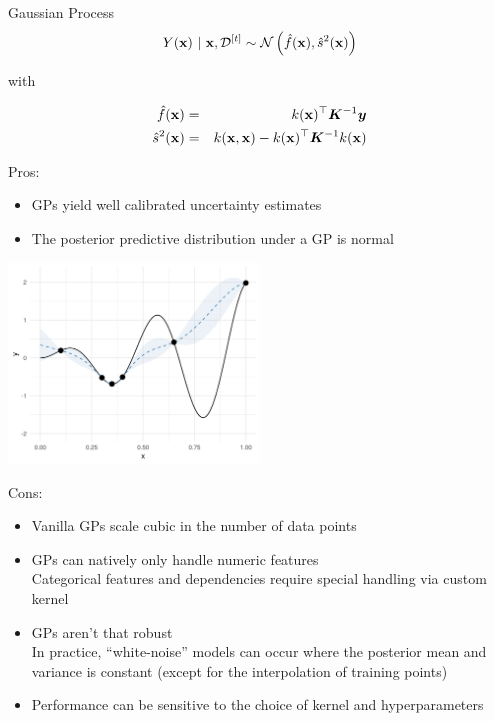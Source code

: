 \documentclass[11pt,compress,t,notes=noshow, xcolor=table]{beamer}
\begin{document}
\begin{vbframe}{Gaussian Process}
\begin{eqnarray*}
  Y(\mathbf{x}) ~|~ \mathbf{x}, \mathcal{D}^{[t]} \sim \mathcal{N}\left(\hat{f}(\mathbf{x}), \hat{s}^2(\mathbf{x})\right)
\end{eqnarray*}

with 

\begin{eqnarray*}
  \hat{f}(\mathbf{x}) &=& k(\mathbf{x})^\top \bm{K}^{-1} \bm{y} \\
  \hat{s}^2(\mathbf{x}) &=& k(\mathbf{x}, \mathbf{x}) - k(\mathbf{x})^\top \bm{K}^{-1} k(\mathbf{x})
\end{eqnarray*}

\vfill

\framebreak

Pros:
\begin{itemize}
  \item GPs yield well calibrated uncertainty estimates
  \item The posterior predictive distribution under a GP is normal
\end{itemize}

\begin{center}
\includegraphics[width = 0.5\textwidth]{figure_man/surrogate_0.png}
\end{center}
\framebreak

Cons:
\begin{itemize}
  \item Vanilla GPs scale cubic in the number of data points
  \item GPs can natively only handle numeric features\\
    Categorical features and dependencies require special handling via custom kernel
  \item GPs aren't that robust\\
    In practice, \enquote{white-noise} models can occur where the posterior mean and variance is constant (except for the interpolation of training points)
  \item Performance can be sensitive to the choice of kernel and hyperparameters
\end{itemize}

\end{vbframe}
\end{document}
